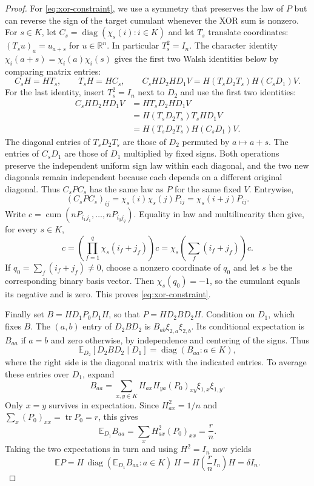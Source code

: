 \documentclass[11pt]{article}
\theoremstyle{definition}
\theoremstyle{remark}
\theoremstyle{plain}
\newcommand{\E}{\mathbb E}
\newcommand{\R}{\mathbb R}
\DeclareMathOperator{\tr}{tr}
\DeclareMathOperator{\diag}{diag}
\DeclareMathOperator{\cum}{cum}
\begin{document}
\begin{proof}
For \eqref{eq:xor-constraint}, we use a symmetry that preserves the
law of $P$ but can reverse the sign of the target cumulant whenever
the XOR sum is nonzero. For $s\in K$, let
\(C_s=\diag(\chi_s(i):i\in K)\) and let $T_s$ translate coordinates:
$(T_su)_a=u_{a+s}$ for $u\in\R^n$. In particular $T_s^2=I_n$.
The character identity
$\chi_i(a+s)=\chi_i(a)\chi_i(s)$ gives the first two Walsh identities
below by comparing matrix entries:
\begin{equation}\label{eq:walsh-conjugation}
 C_sH=HT_s,\qquad T_sH=HC_s,\qquad
 C_sHD_2HD_1V=H(T_sD_2T_s)H(C_sD_1)V.
\end{equation}
For the last identity, insert $T_s^2=I_n$ next to $D_2$ and use
the first two identities:
\[
 \begin{aligned}
 C_sHD_2HD_1V
 &=HT_sD_2HD_1V\\
 &=H(T_sD_2T_s)T_sHD_1V\\
 &=H(T_sD_2T_s)H(C_sD_1)V.
 \end{aligned}
\]
The diagonal entries of $T_sD_2T_s$ are those of $D_2$ permuted
by $a\mapsto a+s$. The entries of $C_sD_1$ are those of $D_1$
multiplied by fixed signs. Both operations preserve the independent
uniform sign law within each diagonal, and the two new diagonals
remain independent because each depends on a different original
diagonal. Thus
\(C_sPC_s\) has the same law as \(P\) for the same fixed \(V\).
Entrywise,
\[
 (C_sPC_s)_{ij}=\chi_s(i)\chi_s(j)P_{ij}
              =\chi_s(i+j)P_{ij}.
\]
Write $c=\cum(nP_{i_1j_1},\ldots,nP_{i_qj_q})$. Equality in law
and multilinearity then give, for every $s\in K$,
\[
 c=\left(\prod_{f=1}^q\chi_s(i_f+j_f)\right)c
   =\chi_s\!\left(\sum_f(i_f+j_f)\right)c.
\]
If
$q_0=\sum_f(i_f+j_f)\ne0$, choose a nonzero coordinate of $q_0$
and let $s$ be the corresponding binary basis vector. Then
$\chi_s(q_0)=-1$, so the cumulant equals its negative and is zero.
This proves \eqref{eq:xor-constraint}.

Finally set \(B=HD_1P_0D_1H\), so that $P=HD_2BD_2H$.
Condition on $D_1$, which fixes $B$. The $(a,b)$ entry of $D_2BD_2$
is $B_{ab}\xi_{2,a}\xi_{2,b}$. Its conditional expectation is
$B_{aa}$ if $a=b$ and zero otherwise, by independence and centering
of the signs. Thus
\[
 \E_{D_2}[D_2BD_2\mid D_1]
      =\diag(B_{aa}:a\in K),
\]
where the right side is the diagonal matrix with the indicated
entries. To average these entries over $D_1$, expand
\[
 B_{aa}=\sum_{x,y\in K}
        H_{ax}H_{ya}(P_0)_{xy}\xi_{1,x}\xi_{1,y}.
\]
Only $x=y$ survives in expectation. Since $H_{ax}^2=1/n$ and
$\sum_x(P_0)_{xx}=\tr P_0=r$, this gives
\[
 \E_{D_1}B_{aa}
     =\sum_x H_{ax}^2(P_0)_{xx}=\frac rn.
\]
Taking the two expectations in turn and using $H^2=I_n$ now yields
\[
 \E P
 =H\,\diag(\E_{D_1}B_{aa}:a\in K)\,H
 =H\left(\frac rn I_n\right)H
 =\delta I_n.
\]
\end{proof}
\end{document}
